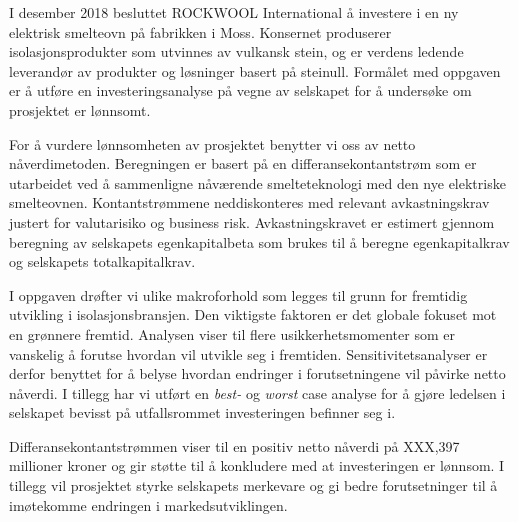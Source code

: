 I desember 2018 besluttet ROCKWOOL International å investere i en ny elektrisk smelteovn på fabrikken i Moss. Konsernet produserer isolasjonsprodukter som utvinnes av vulkansk stein, og er verdens ledende leverandør av produkter og løsninger basert på steinull. Formålet med oppgaven er å utføre en investeringsanalyse på vegne av selskapet for å undersøke om prosjektet er lønnsomt. 

\indent \newline
For å vurdere lønnsomheten av prosjektet benytter vi oss av netto nåverdimetoden. Beregningen er basert på en differansekontantstrøm som er utarbeidet ved å sammenligne nåværende smelteteknologi med den nye elektriske smelteovnen. Kontantstrømmene neddiskonteres med relevant avkastningskrav justert for valutarisiko og business risk. Avkastningskravet er estimert gjennom beregning av selskapets egenkapitalbeta som brukes til å beregne egenkapitalkrav og selskapets totalkapitalkrav.

\indent \newline
I oppgaven drøfter vi ulike makroforhold som legges til grunn for fremtidig utvikling i isolasjonsbransjen. Den viktigste faktoren er det globale fokuset mot en grønnere fremtid. Analysen viser til flere usikkerhetsmomenter som er vanskelig å forutse hvordan vil utvikle seg i fremtiden. Sensitivitetsanalyser er derfor benyttet for å belyse hvordan endringer i forutsetningene vil påvirke netto nåverdi. I tillegg har vi utført en \textit{best-} og \textit{worst} case analyse for å gjøre ledelsen i selskapet bevisst på utfallsrommet investeringen befinner seg i.

\indent \newline
Differansekontantstrømmen  viser til en positiv netto nåverdi på XXX,397 millioner kroner og gir støtte til å konkludere med at investeringen er lønnsom. I tillegg vil prosjektet styrke selskapets merkevare og gi bedre forutsetninger til å imøtekomme endringen i markedsutviklingen.
